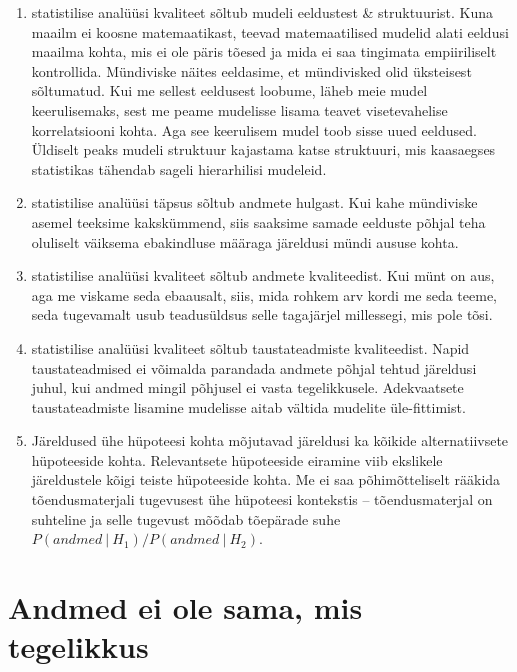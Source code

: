 \documentclass[]{book}
\begin{document}
\begin{enumerate}
\def\labelenumi{\arabic{enumi}.}
\item
  statistilise analüüsi kvaliteet sõltub mudeli eeldustest \& struktuurist. Kuna maailm ei koosne matemaatikast, teevad matemaatilised mudelid alati eeldusi maailma kohta, mis ei ole päris tõesed ja mida ei saa tingimata empiiriliselt kontrollida. Mündiviske näites eeldasime, et mündivisked olid üksteisest sõltumatud. Kui me sellest eeldusest loobume, läheb meie mudel keerulisemaks, sest me peame mudelisse lisama teavet visetevahelise korrelatsiooni kohta. Aga see keerulisem mudel toob sisse uued eeldused. Üldiselt peaks mudeli struktuur kajastama katse struktuuri, mis kaasaegses statistikas tähendab sageli hierarhilisi mudeleid.
\item
  statistilise analüüsi täpsus sõltub andmete hulgast. Kui kahe mündiviske asemel teeksime kakskümmend, siis saaksime samade eelduste põhjal teha oluliselt väiksema ebakindluse määraga järeldusi mündi aususe kohta.
\item
  statistilise analüüsi kvaliteet sõltub andmete kvaliteedist. Kui münt on aus, aga me viskame seda ebaausalt, siis, mida rohkem arv kordi me seda teeme, seda tugevamalt usub teadusüldsus selle tagajärjel millessegi, mis pole tõsi.
\item
  statistilise analüüsi kvaliteet sõltub taustateadmiste kvaliteedist. Napid taustateadmised ei võimalda parandada andmete põhjal tehtud järeldusi juhul, kui andmed mingil põhjusel ei vasta tegelikkusele. Adekvaatsete taustateadmiste lisamine mudelisse aitab vältida mudelite üle-fittimist.
\item
  Järeldused ühe hüpoteesi kohta mõjutavad järeldusi ka kõikide alternatiivsete hüpoteeside kohta. Relevantsete hüpoteeside eiramine viib ekslikele järeldustele kõigi teiste hüpoteeside kohta. Me ei saa põhimõtteliselt rääkida tõendusmaterjali tugevusest ühe hüpoteesi kontekstis -- tõendusmaterjal on suhteline ja selle tugevust mõõdab tõepärade suhe \(P(andmed~\vert~ H_1)/P(andmed ~ \vert ~H_2)\).
\end{enumerate}

\hypertarget{andmed-ei-ole-sama-mis-tegelikkus}{%
\section*{Andmed ei ole sama, mis tegelikkus}\label{andmed-ei-ole-sama-mis-tegelikkus}}
\end{document}

